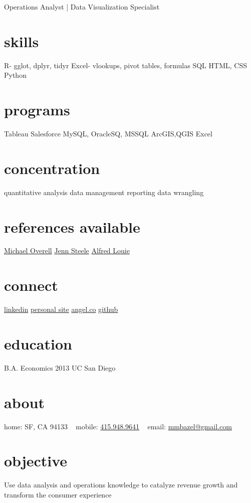 \documentclass[]{friggeri-cv}
\begin{document}
       {Operations Analyst | Data Visualization Specialist}
\begin{aside}
\section{skills}
R-
gglot, dplyr, tidyr
Excel-
vlookups, pivot tables, formulas
SQL
HTML, CSS
Python
\section{programs}
Tableau
Salesforce
MySQL, OracleSQ, MSSQL
ArcGIS,QGIS
Excel
\section{concentration}
 quantitative analysis
 data management
 reporting
data wrangling
  \section{references available}
\href{https://www.linkedin.com/in/michaeloverell}{Michael Overell}
\href{https://www.linkedin.com/in/jennsteele}{Jenn Steele}
\href{https://www.linkedin.com/pub/alfred-louie/a5/a46/281}{Alfred Louie} 
 \section{connect}
\href{https://www.linkedin.com/in/mikikobazeley}{linkedin}
\href{http://mikikobazeley.github.io}{personal site}
\href{https://angel.co/mikiko-bazeley}{angel.co}
\href{https://github.com/MMBazel}{github}
  \section{education}
B.A. Economics
2013
UC San Diego
  \section{about}
  home:
    SF, CA 94133
    ~
    mobile: 
    \href{tel:14159489641}{415.948.9641}
    ~
    email:
    \href{mailto:mmbazel@gmail.com}{mmbazel@gmail.com}
\end{aside}

\section{objective}
Use data analysis and operations knowledge to catalyze revenue
growth and transform the consumer experience
\end{document}
